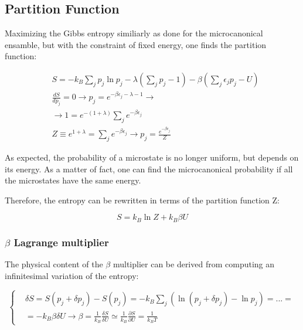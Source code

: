 \documentclass{article}
\begin{document}
\subsection{Partition Function}

Maximizing the Gibbs entropy similiarly as done for the microcanonical ensamble, but with the constraint of fixed energy, one finds the partition function:

\begin{equation}
    \begin{aligned}
         & S= -k_B\sum_{j}p_j\ln{p_j}-\lambda\left(\sum_{j}p_j-1\right)-\beta\left(\sum_{j}\epsilon_jp_j-U\right) \\
         & \frac{dS}{dp_j}=0 \rightarrow p_j=e^{-\beta\epsilon_j-\lambda-1} \rightarrow                           \\
         & \rightarrow 1=e^{-(1+\lambda)}\sum_{j}e^{-\beta\epsilon_j}                                             \\
         & Z\equiv e^{1+\lambda}=\sum_{j}e^{-\beta\epsilon_j} \rightarrow p_j=\frac{e^{-\beta\epsilon_j}}{Z}
    \end{aligned}
\end{equation}

As expected, the probability of a microstate is no longer uniform, but depends on its energy.
As a matter of fact, one can find the microcanonical probability if all the microstates have the same energy.

Therefore, the entropy can be rewritten in terms of the partition function Z:

\begin{equation}
    S=k_B\ln{Z}+k_B\beta U
\end{equation}

\subsubsection{$\beta$ Lagrange multiplier}

The physical content of the $\beta$ multiplier can be derived from computing
an infinitesimal variation of the entropy:

\begin{equation}
    \left\{
    \begin{aligned}
         & \delta S= S(p_j+\delta p_j)-S(p_j) = -k_B\sum_{j}(\ln{(p_j+\delta p_j)}-\ln{p_j})=...=                                                        \\
         & = -k_B\beta\delta U \rightarrow \beta=\frac{1}{k_B}\frac{\delta S}{\delta U}\simeq \frac{1}{k_B}\frac{\partial S}{\partial U}= \frac{1}{k_BT}
    \end{aligned}
    \right.
\end{equation}
\end{document}
